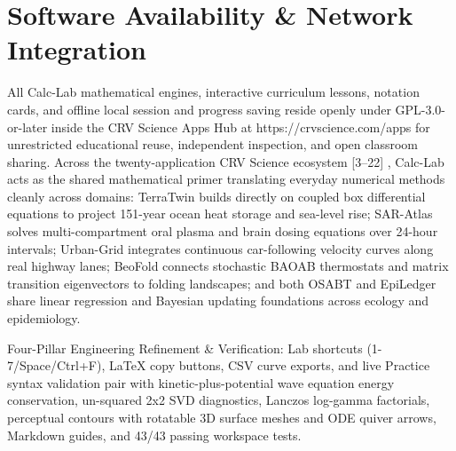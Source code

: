 \documentclass[10pt,letterpaper]{article}
\begin{document}
\section{Software Availability \& Network Integration}
All Calc-Lab mathematical engines, interactive curriculum lessons, notation cards, and offline local session and progress saving reside openly under GPL-3.0-or-later inside the CRV Science Apps Hub at https://crvscience.com/apps for unrestricted educational reuse, independent inspection, and open classroom sharing. Across the twenty-application CRV Science ecosystem [3--22] , Calc-Lab acts as the shared mathematical primer translating everyday numerical methods cleanly across domains: TerraTwin builds directly on coupled box differential equations to project 151-year ocean heat storage and sea-level rise; SAR-Atlas solves multi-compartment oral plasma and brain dosing equations over 24-hour intervals; Urban-Grid integrates continuous car-following velocity curves along real highway lanes; BeoFold connects stochastic BAOAB thermostats and matrix transition eigenvectors to folding landscapes; and both OSABT and EpiLedger share linear regression and Bayesian updating foundations across ecology and epidemiology.

Four-Pillar Engineering Refinement \& Verification: Lab shortcuts (1-7/Space/Ctrl+F), LaTeX copy buttons, CSV curve exports, and live Practice syntax validation pair with kinetic-plus-potential wave equation energy conservation, un-squared 2x2 SVD diagnostics, Lanczos log-gamma factorials, perceptual contours with rotatable 3D surface meshes and ODE quiver arrows, Markdown guides, and 43/43 passing workspace tests.
\end{document}
